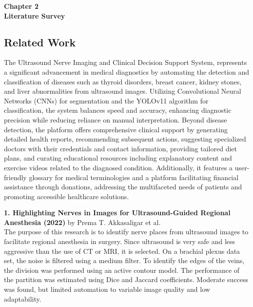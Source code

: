 \documentclass[12pt]{article}
\begin{document}
\vspace*{\fill}
\begin{center}
    {\Large \bf Chapter 2} \\[1em] %
    {\Large \bf Literature Survey}
\end{center}
\vspace*{\fill}
\newpage
\setcounter{section}{2}

\subsection{Related Work}
\vspace{10pt}
\noindent The Ultrasound Nerve Imaging and Clinical Decision Support System, represents a significant advancement in medical diagnostics by automating the detection and classification of diseases such as thyroid disorders, breast cancer, kidney stones, and liver abnormalities from ultrasound images. Utilizing Convolutional Neural Networks (CNNs) for segmentation and the YOLOv11 algorithm for classification, the system balances speed and accuracy, enhancing diagnostic precision while reducing reliance on manual interpretation. Beyond disease detection, the platform offers comprehensive clinical support by generating detailed health reports, recommending subsequent actions, suggesting specialized doctors with their credentials and contact information, providing tailored diet plans, and curating educational resources including explanatory content and exercise videos related to the diagnosed condition. Additionally, it features a user-friendly glossary for medical terminologies and a platform facilitating financial assistance through donations, addressing the multifaceted needs of patients and promoting accessible healthcare solutions.

\vspace{10pt}

\noindent \textbf{1. Highlighting Nerves in Images for Ultrasound-Guided Regional Anesthesia (2022)} by Prema T. Akkasaligar et al.\\
The purpose of this research is to identify nerve places from ultrasound images to facilitate regional anesthesia in surgery. Since ultrasound is very safe and less
aggressive than the use of CT or MRI, it is selected. On a brachial plexus data set, the noise is
filtered using a medium filter. To identify the edges of the veins, the division was performed using
an active contour model. The performance of the partition was estimated using Dice and Jaccard
coefficients. Moderate success was found, but limited automation to variable image quality and
low adaptability.\\
\end{document}
